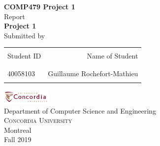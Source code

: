 \begin{titlepage}

    \begin{center}
    
    \textup{\small {\bf COMP479 Project 1} \\ Report}\\[0.2in]
    
    \Large \textbf {Project 1}\\[0.5in]
    
    \normalsize Submitted by \\
    \begin{table}[h]
    \centering
    \begin{tabular}{lr}\hline \\
    Student ID & Name of Student \\ \\ \hline
    \\
    40058103 & Guillaume Rochefort-Mathieu \\ \\ \hline 
    \end{tabular}
    \end{table}
    
    \vfill
    
    \includegraphics[width=0.18\textwidth]{./concordia}\\[0.1in]
    \Large{Department of Computer Science and Engineering}\\
    \normalsize
    \textsc{Concordia University}\\
    Montreal \\
    \vspace{0.2cm}
    Fall 2019
    
    \end{center}
    
    \end{titlepage}